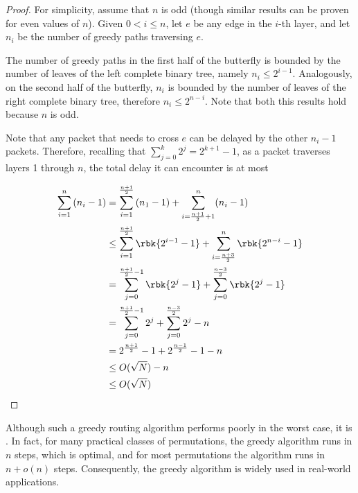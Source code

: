 \documentclass[a4paper, 12pt]{report}
\begin{document}
    \begin{proof}
        For simplicity, assume that $n$ is odd (though similar results can be proven for even values of $n$). Given $0 < i \le n$, let $e$ be any edge in the $i$-th layer, and let $n_i$ be the number of greedy paths traversing $e$.

        The number of greedy paths in the first half of the butterfly is bounded by the number of leaves of the left complete binary tree, namely $n_i \le 2^{i - 1}$. Analogously, on the second half of the butterfly, $n_i$ is bounded by the number of leaves of the right complete binary tree, therefore $n_i \le 2^{n - i}$. Note that both this results hold because $n$ is odd.

        Note that any packet that needs to cross $e$ can be delayed by  the other $n_i - 1$ packets. Therefore, recalling that $\displaystyle \sum_{j = 0}^k {2^j} = 2^{k + 1} - 1$, as a packet traverses layers 1 through $n$, the total delay it can encounter is at most

        \begin{equation*}
            \begin{split}
                \sum_{i = 1}^n {(n_i -1)} &= \sum_{i = 1}^\frac{n + 1}{2} {(n_1 - 1)} + \sum_{i = \frac{n + 1}{2} + 1}^n(n_i - 1) \\
                                          &\le \sum_{i = 1}^\frac{n + 1}{2} {\rbk{2^{i - 1} - 1}} + \sum_{i = \frac{n + 3}{2}}^n {\rbk{2^{n - i} - 1}} \\
                                          &= \sum_{j = 0}^{\frac{n + 1}{2} - 1}{\rbk{2^j - 1}} + \sum_{j = 0}^{\frac{n - 3}{2}} {\rbk{2^j - 1}} \\
                                          &=\sum_{j = 0}^{\frac{n + 1}{2} - 1}{2^j} + \sum_{j = 0}^{\frac{n - 3}{2}} {2^j} - n \\
                                          &=2^{\frac{n + 1}{2}} - 1 + 2^{\frac{n - 1}{2}} - 1 - n \\
                                            &\le O(\sqrt N) - n \\
                                            &\le O(\sqrt N)
            \end{split}
        \end{equation*}
    \end{proof}

    Although such a greedy routing algorithm performs poorly in the worst case, it is . In fact, for many practical classes of permutations, the greedy algorithm runs in $n$ steps, which is optimal, and for most permutations the algorithm runs in $n + o(n)$ steps. Consequently, the greedy algorithm is widely used in real-world applications.
\end{document}
